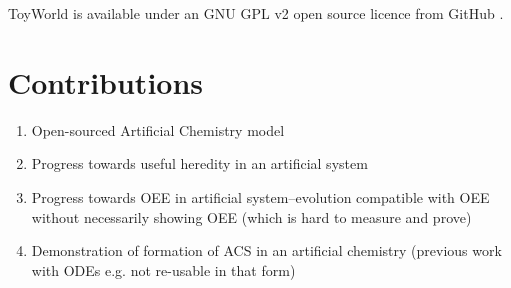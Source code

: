 ToyWorld is available under an GNU GPL v2 open source licence from GitHub \cite{toyworld}.

\section{Contributions}\label{contributions}

\begin{enumerate}
	\item
	Open-sourced Artificial Chemistry model
	\item
	Progress towards useful heredity in an artificial system
	\item
	Progress towards OEE in artificial system--evolution compatible with
	OEE without necessarily showing OEE (which is hard to measure and
	prove)
	\item
	Demonstration of formation of ACS in an artificial chemistry (previous
	work with ODEs e.g. \autocite{Hurndall2014} not re-usable in that form)
\end{enumerate}
